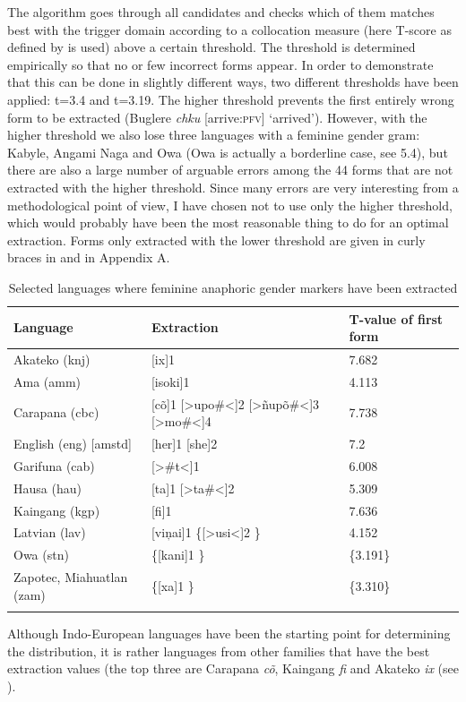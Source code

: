 \documentclass[output=collectionpaper]{langsci/langscibook}
\begin{document}
The algorithm goes through all candidates and checks which of them matches best with the trigger domain according to a collocation measure (here T-score as defined by \citealt{Fung1994} is used) above a certain threshold. The threshold is determined empirically so that no or few incorrect forms appear. In order to demonstrate that this can be done in slightly different ways, two different thresholds have been applied: t=3.4 and t=3.19. The higher threshold prevents the first entirely wrong form to be extracted (Buglere \textit{chku} [arrive:\textsc{pfv}] ‘arrived’). However, with the higher threshold we also lose three languages with a feminine gender gram: Kabyle, Angami Naga and Owa (Owa is actually a borderline case, see 5.4), but there are also a large number of arguable errors among the 44 forms that are not extracted with the higher threshold. Since many errors are very interesting from a methodological point of view, I have chosen not to use only the higher threshold, which would probably have been the most reasonable thing to do for an optimal extraction. Forms only extracted with the lower threshold are given in curly braces in  and in Appendix A.

\begin{table}
\begin{tabularx}{\textwidth}{lll}
\lsptoprule
Language	&	Extraction	&	T-value of first form	\\
\midrule
Akateko (knj)	&	[ix]1	&	7.682	\\
Ama (amm)	&	[isoki]1	&	4.113	\\
Carapana (cbc)	&	[cõ]1 [>upo\#<]2 [>ñupõ\#<]3 [>mo\#<]4	&	7.738	\\
English (eng) [amstd]	&	[her]1 [she]2	&	7.2	\\
Garifuna (cab)	&	[>\#t<]1	&	6.008	\\
Hausa (hau)	&	[ta]1 [>ta\#<]2	&	5.309	\\
Kaingang (kgp)	&	[fi]1	&	7.636	\\
Latvian (lav)	&	[viņai]1 \{[>usi<]2 \}	&	4.152	\\
Owa (stn)	&	\{[kani]1 \}	&	\{3.191\}	\\
Zapotec, Miahuatlan (zam)	&	\{[xa\textquotesingle]1 \}	&	\{3.310\}	\\
\lspbottomrule
\end{tabularx}
\caption{Selected languages where feminine anaphoric gender markers have been extracted}
\label{tab:BW:2}
\end{table}

Although Indo-European languages have been the starting point for determining the distribution, it is rather languages from other families that have the best extraction values (the top three are Carapana \textit{cõ}, Kaingang \textit{fi} and Akateko \textit{ix} (see ).
\end{document}
